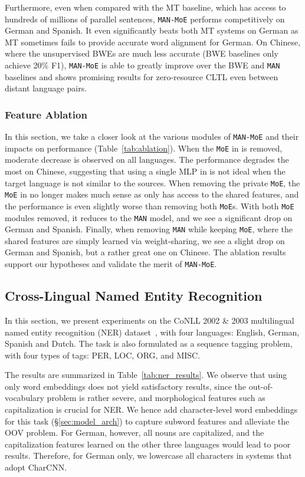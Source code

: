 \documentclass[11pt,a4paper]{article}
\newcommand{\secref}[1]{\S\ref{#1}}
\newcommand{\manmoe}{\texttt{MAN-MoE}}
\newcommand{\man}{\texttt{MAN}}
\newcommand{\moe}{\texttt{MoE}}
\begin{document}
Furthermore, even when compared with the MT baseline, which has access to hundreds of millions of parallel sentences, \manmoe{} performs competitively on German and Spanish.
It even significantly beats both MT systems on German as MT sometimes fails to provide accurate word alignment for German.
On Chinese, where the unsupervised BWEs are much less accurate (BWE baselines only achieve 20\% F1), \manmoe{} is able to greatly improve over the BWE and \man{} baselines and shows promising results for zero-resource CLTL even between distant language pairs.

\subsubsection{Feature Ablation}\label{sec:exp:ablation}

In this section, we take a closer look at the various modules of \manmoe{} and their impacts on performance (Table~\ref{tab:ablation}).
When the \moe{} in  is removed, moderate decrease is observed on all languages.
The performance degrades the most on Chinese, suggesting that using a single MLP in  is not ideal when the target language is not similar to the sources.
When removing the private \moe{}, the \moe{} in  no longer makes much sense as  only has access to the shared features, and the performance is even slightly worse than removing both \moe{}s.
With both \moe{} modules removed, it reduces to the \man{} model, and we see a significant drop on German and Spanish.
Finally, when removing \man{} while keeping \moe{}, where the shared features are simply learned via weight-sharing, we see a slight drop on German and Spanish, but a rather great one on Chinese.
The ablation results support our hypotheses and validate the merit of \manmoe{}.

\subsection{Cross-Lingual Named Entity Recognition}\label{sec:exp:ner}

In this section, we present experiments on the CoNLL 2002 \& 2003 multilingual named entity recognition (NER) dataset~\cite{W02-2024,W03-0419}, with four languages: English, German, Spanish and Dutch.
The task is also formulated as a sequence tagging problem, with four types of tags: PER, LOC, ORG, and MISC.

The results are summarized in Table~\ref{tab:ner_results}.
We observe that using only word embeddings does not yield satisfactory results, since the out-of-vocabulary problem is rather severe, and morphological features such as capitalization is crucial for NER.
We hence add character-level word embeddings for this task (\secref{sec:model_arch}) to capture subword features and alleviate the OOV problem.
For German, however, all nouns are capitalized, and the capitalization features learned on the other three languages would lead to poor results.
Therefore, for German only, we lowercase all characters in systems that adopt CharCNN.
\end{document}
